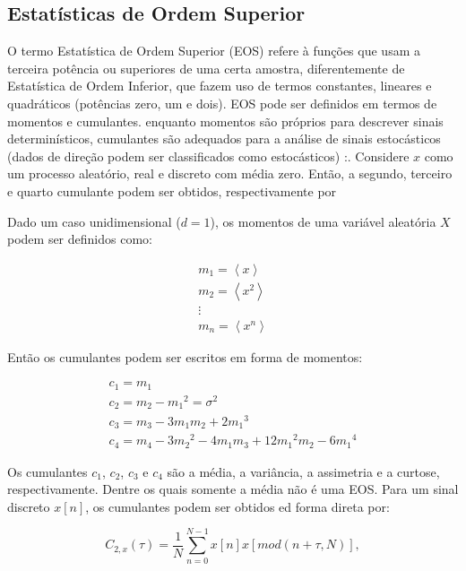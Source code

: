 \subsection{Estatísticas de Ordem Superior}

O termo Estatística de Ordem Superior (EOS) refere à funções que usam a terceira potência ou superiores de uma certa amostra, diferentemente de Estatística de Ordem Inferior, que fazem uso de termos constantes, lineares e quadráticos (potências zero, um e dois). EOS pode ser definidos em termos de momentos e cumulantes. enquanto momentos são próprios para descrever sinais determinísticos, cumulantes são adequados para a análise de sinais estocásticos (dados de direção podem ser classificados como estocásticos) \cite{guedes2016non}:. 
Considere $x$ como um processo aleatório, real e discreto com média zero. Então, a segundo, terceiro e quarto cumulante podem ser obtidos, respectivamente por 

Dado um caso unidimensional ($d = 1$), os momentos de uma variável aleatória $X$ podem ser definidos como:

\begin{equation}
\begin{matrix}
m_1 = \left \langle x \right \rangle\\ 
m_2 = \left \langle x^{2} \right \rangle\\ 
\vdots \\ 
m_n = \left \langle x^{n} \right \rangle
\end{matrix}
\end{equation}

Então os cumulantes podem ser escritos em forma de momentos:

\begin{equation}
\begin{matrix}
c_1 = m_1\\ 
c_2 = m_2-{m_1}^2=\sigma^2\\ 
c_3 = m_3-3{m_1}{m_2}+2{m_1}^3\\ 
c_4 = m_4 - 3{m_2}^2-4m_1m_3+12{m_1}^2m_2-6{m_1}^4
\end{matrix}
\end{equation}

Os cumulantes $c_1$, $c_2$, $c_3$ e $c_4$ são a média, a variância, a assimetria e a curtose, respectivamente. Dentre os quais somente a média não é uma EOS. Para um sinal discreto $x[n]$, os cumulantes podem ser obtidos ed forma direta por:

\begin{equation}
C_{2,x}(\tau) = \frac{1}{N}\sum_{n=0}^{N-1}x[n]x[mod(n+\tau,N)],
\label{eq:Dcum2}
\end{equation}

